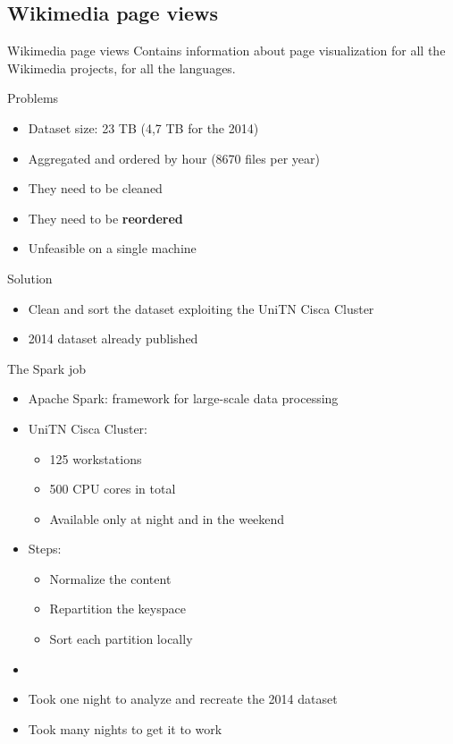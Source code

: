 \documentclass{beamer}
\begin{document}
\subsection{Wikimedia page views}
\begin{frame}{Wikimedia page views}
    Contains information about page visualization for all the Wikimedia projects, for all the languages.
    \begin{block}{Problems}
        \begin{itemize}
            \item Dataset size: 23 TB (4,7 TB for the 2014)
            \item Aggregated and ordered by hour (8670 files per year)
            \item They need to be cleaned
            \item They need to be \textbf{reordered}
            \item Unfeasible on a single machine
        \end{itemize}
    \end{block}
    \begin{block}{Solution}
        \begin{itemize}
            \item Clean and sort the dataset exploiting the UniTN Cisca Cluster
            \item 2014 dataset already published~\cite{Bogon2016}
        \end{itemize}
    \end{block}
\end{frame}

\begin{frame}{The Spark job}
    \begin{itemize}
        \item Apache Spark: framework for large-scale data processing
        \item UniTN Cisca Cluster:
        \begin{itemize}
            \item 125 workstations
            \item 500 CPU cores in total
            \item Available only at night and in the weekend
        \end{itemize}
        \item Steps:
        \begin{itemize}
            \item Normalize the content
            \item Repartition the keyspace
            \item Sort each partition locally
        \end{itemize}
        \item[]
        \item Took one night to analyze and recreate the 2014 dataset
        \item Took many nights to get it to work
    \end{itemize}
\end{frame}
\end{document}
